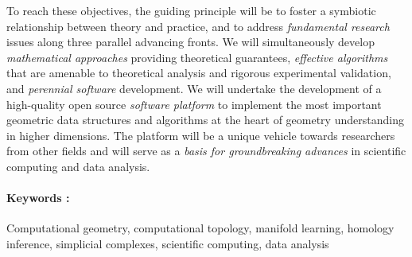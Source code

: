 To reach these objectives, the guiding principle will be to foster a
symbiotic relationship between theory and practice, and to address
{\em fundamental research} issues along three parallel advancing
fronts. We will simultaneously develop {\em mathematical approaches}
providing theoretical guarantees, {\em effective algorithms} that are
amenable to theoretical analysis and rigorous experimental validation,
and {\em perennial software} development.  We will undertake the
development of a high-quality open source {\em software platform} to
implement the most important geometric data structures and algorithms
at the heart of geometry understanding in higher dimensions. The
platform will be a unique vehicle towards researchers from other
fields and will serve as a {\em basis for groundbreaking advances} in
scientific computing and data analysis.



\paragraph{Keywords :} Computational geometry, computational topology,
manifold learning, homology inference, simplicial complexes,
scientific computing, data analysis